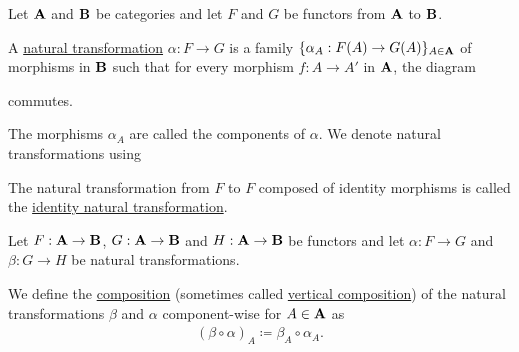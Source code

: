 \begin{definition}\label{def:natural_transformation}\cite[definition 1.3.1]{Leinster2014}
  Let $\operatorname{\mathbf{A}}$ and $\operatorname{\mathbf{B}}$ be categories and let $F$ and $G$ be functors from $\operatorname{\mathbf{A}}$ to $\operatorname{\mathbf{B}}$.

  A \uline{natural transformation} $\alpha: F \to G$ is a family $\{ \alpha_A: F(A) \to G(A) \}_{A \in \operatorname{\mathbf{A}}}$ of morphisms in $\operatorname{\mathbf{B}}$ such that for every morphism $f: A \to A'$ in $\operatorname{\mathbf{A}}$, the diagram
  \begin{center}
  \end{center}
  commutes.

  The morphisms $\alpha_A$ are called the components of $\alpha$. We denote natural transformations using
  \begin{center}
  \end{center}

  The natural transformation from $F$ to $F$ composed of identity morphisms is called the \uline{identity natural transformation}.
\end{definition}

\begin{definition}\label{def:natural_transformation_composition}
  Let $F: \operatorname{\mathbf{A}} \to \operatorname{\mathbf{B}}$, $G: \operatorname{\mathbf{A}} \to \operatorname{\mathbf{B}}$ and $H: \operatorname{\mathbf{A}} \to \operatorname{\mathbf{B}}$ be functors and let $\alpha: F \to G$ and $\beta: G \to H$ be natural transformations.

  We define the \uline{composition} (sometimes called \uline{vertical composition}) of the natural transformations $\beta$ and $\alpha$ component-wise for $A \in \operatorname{\mathbf{A}}$ as
  \begin{align*}
    (\beta \circ \alpha)_A \coloneqq \beta_{A} \circ \alpha_A.
  \end{align*}
\end{definition}

